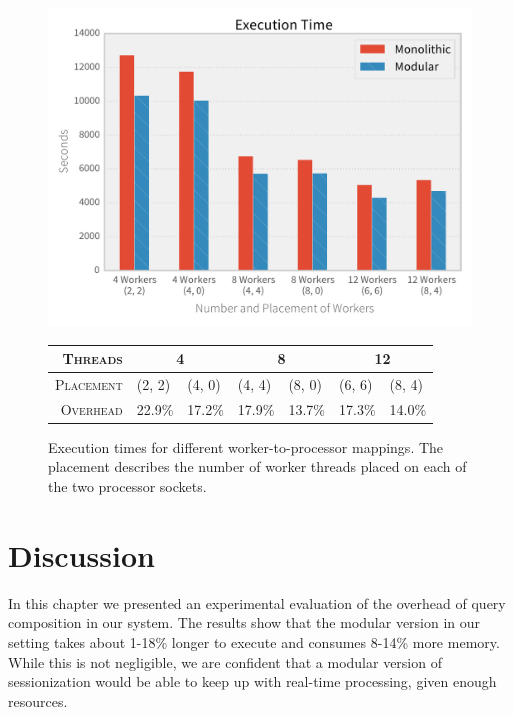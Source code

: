 \begin{figure}[h]
  \centering
    \includegraphics[width=1\textwidth]{figures/evaluation/numa}

    {\footnotesize
    \vspace{1em}
    \begin{tabularx}{\textwidth}{ r|XX|XX|XX }
      \hline 
      \textsc{Threads} & \multicolumn{2}{c|}{4} & \multicolumn{2}{c|}{8} & \multicolumn{2}{c}{12} \\
      \hline 
      \textsc{Placement} & (2, 2)&(4, 0)&(4, 4)&(8, 0)&(6, 6)&(8, 4)\\
      \hline 
      \textsc{Overhead} & 22.9\%&17.2\%&17.9\%&13.7\%&17.3\%&14.0\% \\
      \hline
    \end{tabularx}
    }
    \caption[Execution time for different worker placements]{Execution times for
    different worker-to-processor mappings. The placement describes the number of
    worker threads placed on each of the two processor sockets.}
    \label{fig:numa}
\end{figure}

\clearpage
\section{Discussion}

In this chapter we presented an experimental evaluation of the overhead of
query composition in our system. The results show that the modular version in
our setting takes about 1-18\% longer to execute and consumes 8-14\% more
memory. While this is not negligible, we are confident that a modular version
of sessionization would be able to keep up with real-time processing, given
enough resources.

